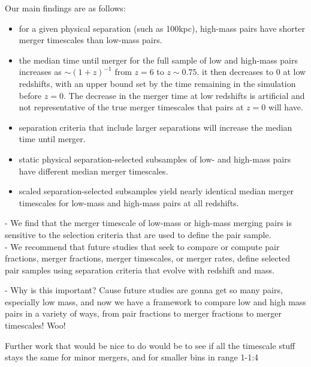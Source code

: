\documentclass[twocolumn,linenumbers]{aastex631}
\begin{document}
    Our main findings are as follows: 
    \begin{itemize}
        \item for a given physical separation (such as 100kpc), high-mass pairs have shorter merger timescales than low-mass pairs. 
        \item the median time until merger for the full sample of low and high-mass pairs increases as $\sim(1+z)^{-1}$ from $z=6$ to $z\sim0.75$. it then decreases to 0 at low redshifts, with an upper bound set by the time remaining in the simulation before $z=0$. The decrease in the merger time at low redshifts is artificial and not representative of the true merger timescales that pairs at $z=0$ will have.
        \item separation criteria that include larger separations will increase the median time until merger.
        \item static physical separation-selected subsamples of low- and high-mass pairs have different median merger timescales.
        \item scaled separation-selected subsamples yield nearly identical median merger timescales for low-mass and high-mass pairs at all redshifts. 
    \end{itemize}
    
    - We find that the merger timescale of low-mass or high-mass merging pairs is sensitive to the selection criteria that are used to define the pair sample.\\
    
    - We recommend that future studies that seek to compare or compute pair fractions, merger fractions, merger timescales, or merger rates, define selected pair samples using separation criteria that evolve with redshift and mass. 
    
    - Why is this important? Cause future studies are gonna get so many pairs, especially low mass, and now we have a framework to compare low and high mass pairs in a variety of ways, from pair fractions to merger fractions to merger timescales! Woo!
    
    Further work that would be nice to do would be to see if all the timescale stuff stays the same for minor mergers, and for smaller bins in range 1-1:4










{}

\end{document}
